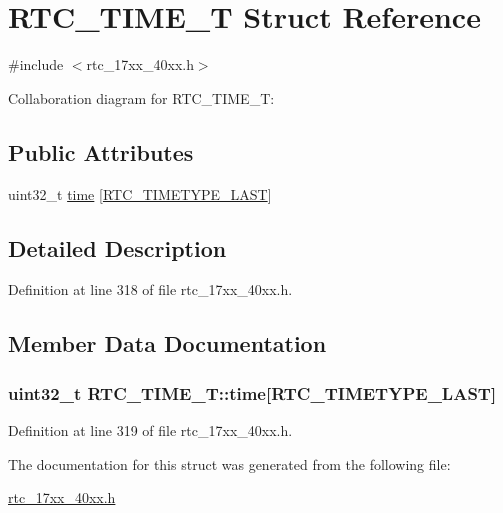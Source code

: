 \hypertarget{structRTC__TIME__T}{}\section{R\+T\+C\+\_\+\+T\+I\+M\+E\+\_\+T Struct Reference}
\label{structRTC__TIME__T}


{\ttfamily \#include $<$rtc\+\_\+17xx\+\_\+40xx.\+h$>$}



Collaboration diagram for R\+T\+C\+\_\+\+T\+I\+M\+E\+\_\+T\+:
\subsection*{Public Attributes}
\begin{DoxyCompactItemize}
\item 
uint32\+\_\+t \hyperlink{structRTC__TIME__T_ac45cc767fc67da10dedd9834caf783e6}{time} \mbox{[}\hyperlink{group__RTC__17XX__40XX_gga8144898fe628404d396db06dc8aac0e0a0d4fafef57b6ef363f9a0875ff339cad}{R\+T\+C\+\_\+\+T\+I\+M\+E\+T\+Y\+P\+E\+\_\+\+L\+A\+ST}\mbox{]}
\end{DoxyCompactItemize}


\subsection{Detailed Description}


Definition at line 318 of file rtc\+\_\+17xx\+\_\+40xx.\+h.



\subsection{Member Data Documentation}
\subsubsection[{\texorpdfstring{time}{time}}]{\setlength{\rightskip}{0pt plus 5cm}uint32\+\_\+t R\+T\+C\+\_\+\+T\+I\+M\+E\+\_\+\+T\+::time\mbox{[}{\bf R\+T\+C\+\_\+\+T\+I\+M\+E\+T\+Y\+P\+E\+\_\+\+L\+A\+ST}\mbox{]}}\hypertarget{structRTC__TIME__T_ac45cc767fc67da10dedd9834caf783e6}{}\label{structRTC__TIME__T_ac45cc767fc67da10dedd9834caf783e6}


Definition at line 319 of file rtc\+\_\+17xx\+\_\+40xx.\+h.



The documentation for this struct was generated from the following file\+:\begin{DoxyCompactItemize}
\item 
\hyperlink{rtc__17xx__40xx_8h}{rtc\+\_\+17xx\+\_\+40xx.\+h}\end{DoxyCompactItemize}
